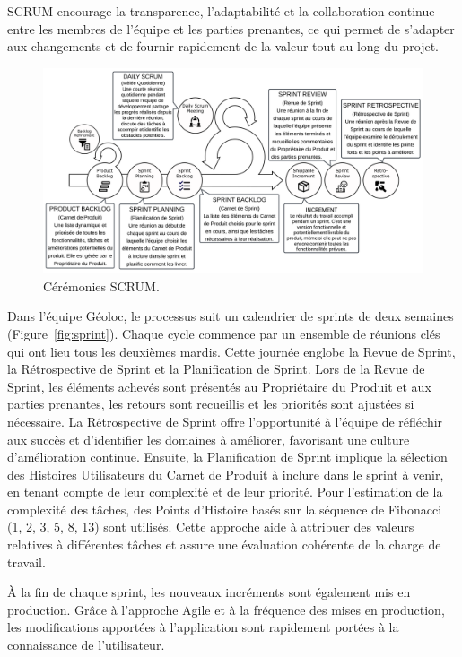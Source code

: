 SCRUM encourage la transparence, l'adaptabilité et la collaboration continue entre les membres de l'équipe et les parties prenantes, ce qui permet de s'adapter aux changements et de fournir rapidement de la valeur tout au long du projet.

\begin{figure}[ht]
    \centering
    \includegraphics[width=\textwidth]{img/agile-02}
    \caption{Cérémonies SCRUM.}
    \label{fig:agile}
\end{figure}

Dans l'équipe Géoloc, le processus suit un calendrier de sprints de deux semaines (Figure~\ref{fig:sprint}). Chaque cycle commence par un ensemble de réunions clés qui ont lieu tous les deuxièmes mardis. Cette journée englobe la Revue de Sprint, la Rétrospective de Sprint et la Planification de Sprint. Lors de la Revue de Sprint, les éléments achevés sont présentés au Propriétaire du Produit et aux parties prenantes, les retours sont recueillis et les priorités sont ajustées si nécessaire. La Rétrospective de Sprint offre l'opportunité à l'équipe de réfléchir aux succès et d'identifier les domaines à améliorer, favorisant une culture d'amélioration continue. Ensuite, la Planification de Sprint implique la sélection des Histoires Utilisateurs du Carnet de Produit à inclure dans le sprint à venir, en tenant compte de leur complexité et de leur priorité. Pour l'estimation de la complexité des tâches, des Points d'Histoire basés sur la séquence de Fibonacci (1, 2, 3, 5, 8, 13) sont utilisés. Cette approche aide à attribuer des valeurs relatives à différentes tâches et assure une évaluation cohérente de la charge de travail.

À la fin de chaque sprint, les nouveaux incréments sont également mis en production. Grâce à l'approche Agile et à la fréquence des mises en production, les modifications apportées à l'application sont rapidement portées à la connaissance de l'utilisateur.

